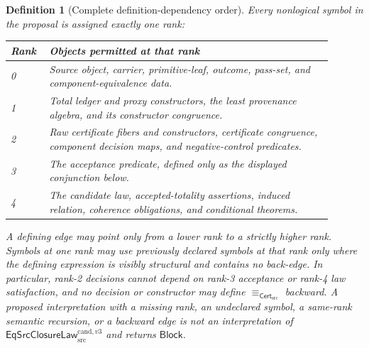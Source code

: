 \documentclass[11pt]{article}
\newtheorem{definition}{Definition}
\newcommand{\Cert}{\mathsf{Cert}_{\mathrm{src}}}
\newcommand{\Law}{\mathsf{EqSrcClosureLaw}^{\mathrm{cand},v3}_{\mathrm{src}}}
\newcommand{\Block}{\mathsf{Block}}
\begin{document}
\begin{definition}[Complete definition-dependency order]
Every nonlogical symbol in the proposal is assigned exactly one rank:
\begin{longtable}{p{0.10\linewidth}p{0.80\linewidth}}
\toprule
Rank & Objects permitted at that rank \\
\midrule
0 & Source object, carrier, primitive-leaf, outcome, pass-set, and component-equivalence data. \\
1 & Total ledger and proxy constructors, the least provenance algebra, and its constructor congruence. \\
2 & Raw certificate fibers and constructors, certificate congruence, component decision maps, and negative-control predicates. \\
3 & The acceptance predicate, defined only as the displayed conjunction below. \\
4 & The candidate law, accepted-totality assertions, induced relation, coherence obligations, and conditional theorems. \\
\bottomrule
\end{longtable}
A defining edge may point only from a lower rank to a strictly higher rank.
Symbols at one rank may use previously declared symbols at that rank only where
the defining expression is visibly structural and contains no back-edge.
In particular, rank-2 decisions cannot depend on rank-3 acceptance or rank-4
law satisfaction, and no decision or constructor may define
\(\equiv_{\Cert}\) backward. A proposed interpretation with a missing rank, an
undeclared symbol, a same-rank semantic recursion, or a backward edge is not an
interpretation of \(\Law\) and returns \(\Block\).
\end{definition}
\end{document}
